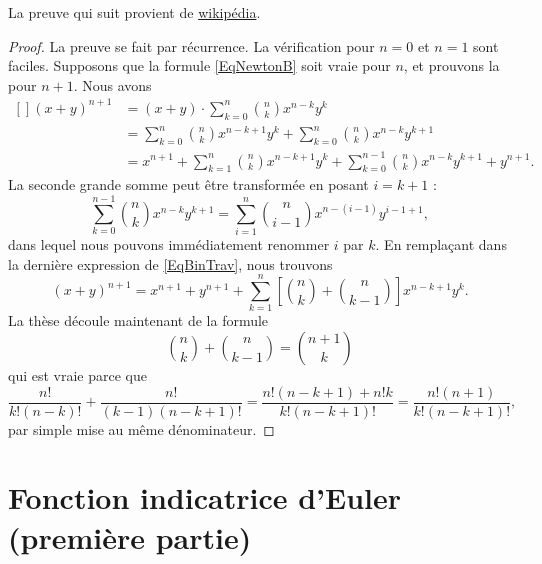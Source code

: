 La preuve qui suit provient de \href{http://fr.wikipedia.org/wiki/Formule_du_binôme_de_Newton}{wikipédia}.
\begin{proof}
La preuve se fait par récurrence. La vérification pour $n=0$ et $n=1$ sont faciles. Supposons que la formule \eqref{EqNewtonB} soit vraie pour $n$, et prouvons la pour $n+1$. Nous avons
\begin{equation}        \label{EqBinTrav}
    \begin{aligned}[]
        (x+y)^{n+1} &=(x+y)\cdot  \sum_{k=0}^n{n\choose k}x^{n-k}y^k\\
                &= \sum_{k=0}^n{n\choose k}x^{n-k+1}y^k+\sum_{k=0}^n{n\choose k}x^{n-k}y^{k+1}\\
                &=x^{n+1}+ \sum_{k=1}^n{n\choose k}x^{n-k+1}y^k+\sum_{k=0}^{n-1}{n\choose k}x^{n-k}y^{k+1}+y^{n+1}.
    \end{aligned}
\end{equation}
La seconde grande somme peut être transformée en posant $i=k+1$ :
\begin{equation}
    \sum_{k=0}^{n-1}{n\choose k}x^{n-k}y^{k+1}  =\sum_{i=1}^n{n\choose i-1}x^{n-(i-1)}y^{i-1+1},
\end{equation}
dans lequel nous pouvons immédiatement renommer $i$ par $k$. En remplaçant dans la dernière expression de \eqref{EqBinTrav}, nous trouvons
\begin{equation}
    (x+y)^{n+1}=x^{n+1}+y^{n+1}+\sum_{k=1}^n\left[ {n\choose k}+{n\choose k-1} \right]x^{n-k+1}y^k.
\end{equation}
La thèse découle maintenant de la formule
\begin{equation}
    {n\choose k}+{n\choose k-1}={n+1\choose k}
\end{equation}
qui est vraie parce que
\begin{equation}
    \frac{ n! }{ k!(n-k)! }+\frac{ n! }{ (k-1)(n-k+1)! }=\frac{ n!(n-k+1)+n!k }{ k!(n-k+1)! }=\frac{ n!(n+1) }{  k!(n-k+1)!  },
\end{equation}
par simple mise au même dénominateur.
\end{proof}

\section{Fonction indicatrice d'Euler (première partie)}

